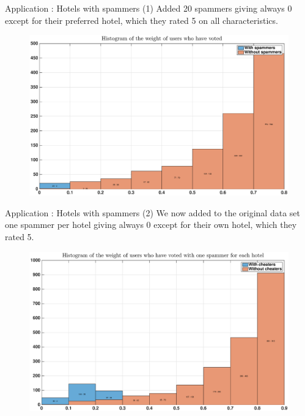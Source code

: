 \begin{frame}{Application : Hotels with spammers (1)}
    Added 20 spammers giving always 0 except for their preferred hotel, which they rated 5 on all characteristics.
            \begin{figure}
            \centering
            \includegraphics[width=\textwidth]{../rapport/images/hotels/not_random_cheaters.eps}
        \end{figure}
\end{frame}

\begin{frame}{Application : Hotels with spammers (2)}
    We now added to the original data set one spammer per hotel giving always 0 except for their own hotel, which they rated 5.
            \begin{figure}
            \centering
            \includegraphics[width=\textwidth]{../rapport/images/hotels/not_random_each_hotels.eps}
        \end{figure}
\end{frame}

